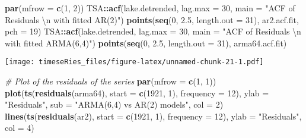 \documentclass[]{book}
\newenvironment{Shaded}{\begin{snugshade}}{\end{snugshade}}
\newcommand{\KeywordTok}[1]{\textcolor[rgb]{0.13,0.29,0.53}{\textbf{#1}}}
\newcommand{\DataTypeTok}[1]{\textcolor[rgb]{0.13,0.29,0.53}{#1}}
\newcommand{\DecValTok}[1]{\textcolor[rgb]{0.00,0.00,0.81}{#1}}
\newcommand{\FloatTok}[1]{\textcolor[rgb]{0.00,0.00,0.81}{#1}}
\newcommand{\CharTok}[1]{\textcolor[rgb]{0.31,0.60,0.02}{#1}}
\newcommand{\StringTok}[1]{\textcolor[rgb]{0.31,0.60,0.02}{#1}}
\newcommand{\CommentTok}[1]{\textcolor[rgb]{0.56,0.35,0.01}{\textit{#1}}}
\newcommand{\OperatorTok}[1]{\textcolor[rgb]{0.81,0.36,0.00}{\textbf{#1}}}
\newcommand{\NormalTok}[1]{#1}
\begin{document}
\begin{Shaded}
\begin{Highlighting}[]
\KeywordTok{par}\NormalTok{(}\DataTypeTok{mfrow =} \KeywordTok{c}\NormalTok{(}\DecValTok{1}\NormalTok{, }\DecValTok{2}\NormalTok{))}
\NormalTok{TSA}\OperatorTok{::}\KeywordTok{acf}\NormalTok{(lake.detrended, }\DataTypeTok{lag.max =} \DecValTok{30}\NormalTok{, }\DataTypeTok{main =} \StringTok{"ACF of Residuals }\CharTok{\textbackslash{}n}\StringTok{ with fitted AR(2)"}\NormalTok{)}
\KeywordTok{points}\NormalTok{(}\KeywordTok{seq}\NormalTok{(}\DecValTok{0}\NormalTok{, }\FloatTok{2.5}\NormalTok{, }\DataTypeTok{length.out =} \DecValTok{31}\NormalTok{), ar2.acf.fit, }\DataTypeTok{pch =} \DecValTok{19}\NormalTok{)}
\NormalTok{TSA}\OperatorTok{::}\KeywordTok{acf}\NormalTok{(lake.detrended, }\DataTypeTok{lag.max =} \DecValTok{30}\NormalTok{, }\DataTypeTok{main =} \StringTok{"ACF of Residuals }\CharTok{\textbackslash{}n}\StringTok{ with fitted ARMA(6,4)"}\NormalTok{)}
\KeywordTok{points}\NormalTok{(}\KeywordTok{seq}\NormalTok{(}\DecValTok{0}\NormalTok{, }\FloatTok{2.5}\NormalTok{, }\DataTypeTok{length.out =} \DecValTok{31}\NormalTok{), arma64.acf.fit)}
\end{Highlighting}
\end{Shaded}

\texttt{[image: timeseRies\_files/figure-latex/unnamed-chunk-21-1.pdf]}

\begin{Shaded}
\begin{Highlighting}[]
\CommentTok{# Plot of the residuals of the series}
\KeywordTok{par}\NormalTok{(}\DataTypeTok{mfrow =} \KeywordTok{c}\NormalTok{(}\DecValTok{1}\NormalTok{, }\DecValTok{1}\NormalTok{))}
\KeywordTok{plot}\NormalTok{(}\KeywordTok{ts}\NormalTok{(}\KeywordTok{residuals}\NormalTok{(arma64), }\DataTypeTok{start =} \KeywordTok{c}\NormalTok{(}\DecValTok{1921}\NormalTok{, }\DecValTok{1}\NormalTok{), }\DataTypeTok{frequency =} \DecValTok{12}\NormalTok{), }\DataTypeTok{ylab =} \StringTok{"Residuals"}\NormalTok{, }
    \DataTypeTok{sub =} \StringTok{"ARMA(6,4) vs AR(2) models"}\NormalTok{, }\DataTypeTok{col =} \DecValTok{2}\NormalTok{)}
\KeywordTok{lines}\NormalTok{(}\KeywordTok{ts}\NormalTok{(}\KeywordTok{residuals}\NormalTok{(ar2), }\DataTypeTok{start =} \KeywordTok{c}\NormalTok{(}\DecValTok{1921}\NormalTok{, }\DecValTok{1}\NormalTok{), }\DataTypeTok{frequency =} \DecValTok{12}\NormalTok{), }\DataTypeTok{ylab =} \StringTok{"Residuals"}\NormalTok{, }
    \DataTypeTok{col =} \DecValTok{4}\NormalTok{)}
\end{Highlighting}
\end{Shaded}
\end{document}
